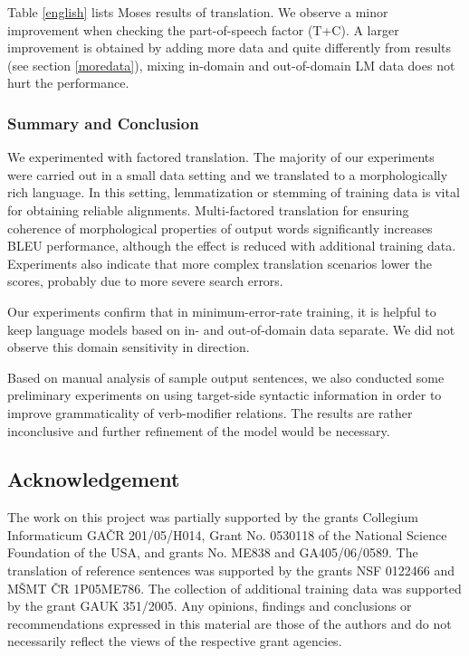 \documentclass[10pt]{report}
\theoremstyle{plain}
\begin{document}
{{Table \ref{english} lists Moses results of \toen{} translation. We observe a
minor improvement when checking the part-of-speech factor (T+C). A larger
improvement is obtained
by adding more data and quite differently from \tocs{} results (see section
\ref{moredata}), mixing in-domain
and out-of-domain LM data does not hurt the performance.




\subsubsection{Summary and Conclusion}

We experimented with factored \tocs{} translation. The majority of our
experiments were carried out in a small data setting and we translated to a
morphologically rich language. In this setting, lemmatization or stemming of
training data is vital for obtaining reliable alignments. Multi-factored
translation for ensuring coherence of morphological properties of output words
significantly increases BLEU performance, although the effect is reduced with
additional training data. Experiments also indicate that more complex
translation scenarios lower the scores, probably due to more severe search
errors.

Our \tocs{} experiments confirm that in minimum-error-rate training, it is
helpful to keep language models based on in- and out-of-domain data separate. We
did not observe this domain sensitivity in \toen{} direction.

Based on manual analysis of sample output sentences, we also conducted some
preliminary experiments on using target-side syntactic information in order to
improve grammaticality of verb-modifier relations.  The results are rather
inconclusive and further refinement of the model would be necessary.



\subsection{Acknowledgement}

The work on this project was partially supported by the grants 
Collegium Informaticum GA\v{C}R 201/05/H014,
Grant No. 0530118 of the National Science Foundation of the USA,
and grants No. ME838 and GA405/06/0589.
The translation of reference sentences was supported by the grants
NSF 0122466 and M\v{S}MT \v{C}R 1P05ME786. The collection of additional training
data was supported by the grant GAUK 351/2005.
Any opinions, findings and conclusions or recommendations expressed in this
material are those of the authors and do not necessarily reflect the views of
the respective grant agencies.

}}
\end{document}
